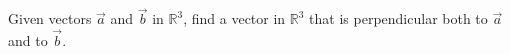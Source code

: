 \documentclass[12pt]{article}
\newcommand{\R}{\mathbb{R}}
\newenvironment{problem}[2][Problem]{\begin{trivlist}
\item[\hskip \labelsep {\bfseries #1}\hskip \labelsep {\bfseries #2.}]}{\end{trivlist}}
\begin{document}

\rhead{\today}


\begin{problem}{1} %

  Given vectors $\vec{a}$ and $\vec{b}$ in $\R^3$, find a vector in $\R^3$ that is perpendicular both to $\vec{a}$ and to $\vec{b}$.
\end{problem}
\end{document}
